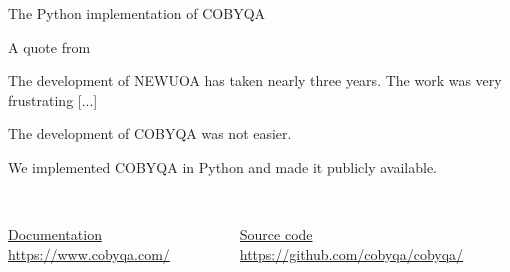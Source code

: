 \documentclass[
]{presentation}
\begin{document}
\begin{frame}{The Python implementation of COBYQA}
    \begin{block}{A quote from \textcite{Powell_2006}}
        \begin{quoting}
            \small%
            The development of NEWUOA has taken nearly \alert{three years}.
            The work was very \alert{frustrating} [...]
        \end{quoting}
        The development of COBYQA was not easier.
    \end{block}

    \smallskip

    We implemented COBYQA in \alert{Python} and made it publicly available.

    \smallskip

    \begin{columns}
        \begin{column}{0.5\textwidth}
            \begin{center}
                \\[1ex]
                \href{https://www.cobyqa.com/}{Documentation}\\[0.5ex]
                \scriptsize\url{https://www.cobyqa.com/}
            \end{center}
        \end{column}
        \begin{column}{0.5\textwidth}
            \begin{center}
                \\[1ex]
                \href{https://github.com/cobyqa/cobyqa/}{Source code}\\[0.5ex]
                \scriptsize\url{https://github.com/cobyqa/cobyqa/}
            \end{center}
        \end{column}
    \end{columns}
\end{frame}
\end{document}
